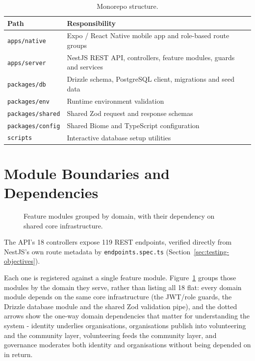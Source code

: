 \begin{table}[H]\centering
\caption{Monorepo structure.}
\label{tab:monorepo}
\begin{tabularx}{\textwidth}{|p{}|X|}
\hline
\textbf{Path} & \textbf{Responsibility}\\\hline
\texttt{apps/native} & Expo / React Native mobile app and role-based route groups\\\hline
\texttt{apps/server} & NestJS REST API, controllers, feature modules, guards and services\\\hline
\texttt{packages/db} & Drizzle schema, PostgreSQL client, migrations and seed data\\\hline
\texttt{packages/env} & Runtime environment validation\\\hline
\texttt{packages/shared} & Shared Zod request and response schemas\\\hline
\texttt{packages/config} & Shared Biome and TypeScript configuration\\\hline
\texttt{scripts} & Interactive database setup utilities\\\hline
\end{tabularx}
\end{table}

\section{Module Boundaries and Dependencies}
\label{sec:modules}
\begin{figure}[H]
    \centering
    \caption{Feature modules grouped by domain, with their dependency on shared core infrastructure.}
    \label{fig:modules}
\end{figure}
\noindent The API's 18 controllers expose 119 REST endpoints, verified directly from NestJS's own route metadata by \texttt{endpoints.spec.ts} (Section~\ref{sec:testing-objectives}).

\clearpage
\noindent Each one is registered against a single feature module. Figure~\ref{fig:modules} groups those modules by the domain they serve, rather than listing all 18 flat: every domain module depends on the same core infrastructure (the JWT/role guards, the Drizzle database module and the shared Zod validation pipe), and the dotted arrows show the one-way domain dependencies that matter for understanding the system - identity underlies organisations, organisations publish into volunteering and the community layer, volunteering feeds the community layer, and governance moderates both identity and organisations without being depended on in return.

